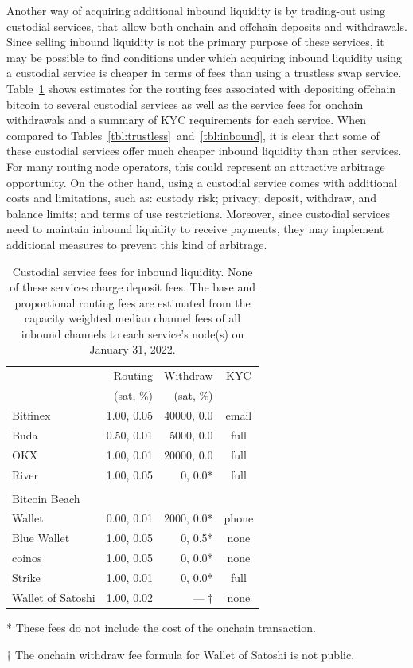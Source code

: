 \documentclass[10pt,twocolumn]{article}
\begin{document}
Another way of acquiring additional inbound liquidity is by
trading-out using custodial services,
that allow both onchain and offchain deposits and withdrawals.
Since selling inbound liquidity is not the primary purpose of these services,
it may be possible to find conditions under which acquiring inbound liquidity
using a custodial service is cheaper in terms of fees than
using a trustless swap service.
Table~\ref{tbl:custodial} shows estimates for the routing fees associated
with depositing offchain bitcoin to several custodial services
as well as the service fees for onchain withdrawals and a summary
of KYC requirements for each service.
When compared to Tables~\ref{tbl:trustless}~and~\ref{tbl:inbound}, it is clear that
some of these custodial services offer much cheaper inbound liquidity than
other services.
For many routing node operators,
this could represent an attractive arbitrage opportunity.
On the other hand, using a custodial service comes with additional costs and limitations, such as:
custody risk;
privacy;
deposit, withdraw, and balance limits;
and terms of use restrictions.
Moreover, since custodial services need to maintain inbound liquidity to receive payments,
they may implement additional measures to prevent this kind of arbitrage.

\begin{table}[tb] \footnotesize
\caption{\label{tbl:custodial}
	Custodial service fees for inbound liquidity.
	None of these services charge deposit fees.
	The base and proportional routing fees are estimated from the
	capacity weighted median channel fees
	of all inbound channels to each service's node(s) on January 31, 2022.
}
\centering
\begin{tabular}{lrrc}
\toprule
	& {Routing} & {Withdraw} & {KYC}\\
	& (sat, \%) & {(sat, \%)} & \\
\midrule
Bitfinex & 1.00, 0.05 & 40000, 0.0\phantom{*} & email \\
Buda & 0.50, 0.01 & 5000, 0.0\phantom{*} & full \\
OKX & 1.00, 0.01 & 20000, 0.0\phantom{*} & full \\
River & 1.00, 0.05 & 0, 0.0* & full \\
\\
Bitcoin Beach\\ \hspace{0.5em}Wallet & 0.00, 0.01 & 2000, 0.0* & phone \\
Blue Wallet & 1.00, 0.05 & 0, 0.5* & none \\
coinos & 1.00, 0.05 & 0, 0.0* & none \\
Strike & 1.00, 0.01 & 0, 0.0* & full \\
Wallet of Satoshi & 1.00, 0.02 & --- $\dagger$ & none \\
\bottomrule
\end{tabular}
\begin{flushleft}
	* These fees do not include the cost of the onchain transaction.

	$\dagger$ The onchain withdraw fee formula for Wallet of Satoshi is not public.
\end{flushleft}
\end{table}
\end{document}
